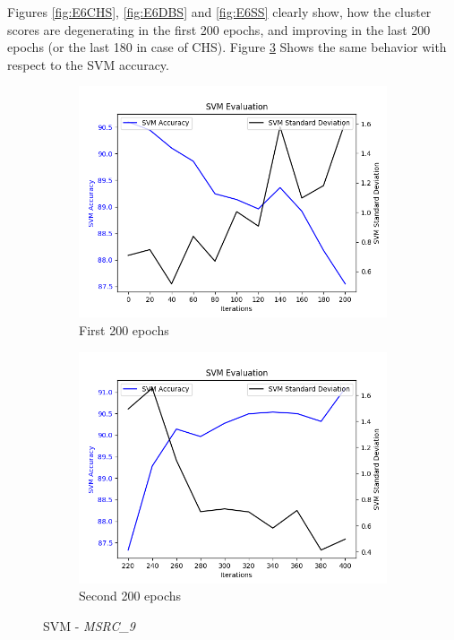 		Figures \ref{fig:E6CHS}, \ref{fig:E6DBS} and \ref{fig:E6SS} clearly show, how the cluster scores are degenerating in the first 200 epochs, and improving in the last 200  epochs (or the last 180 in case of CHS).
		Figure \ref{fig:E6SVM} Shows the same behavior with respect to the SVM accuracy.
				
		\begin{figure}[!ht]
			\centering
			\begin{subfigure}{0.49\textwidth}
				\centering
				\includegraphics[width=1.1\linewidth]{images/plotE6_SVM_MSRC_9_E_GDL_22_00h-05mExp3pull}
				\caption{First 200 epochs}
				\label{fig:plote6svmmsrc9egdl2200h-05mexp3pull}
			\end{subfigure}
			\begin{subfigure}{0.49\textwidth}
				\centering
				\includegraphics[width=1.1\linewidth]{images/plotE6_SVM_MSRC_9_E_GDL_22_00h-05mExp3pullpush}
				\caption{Second 200 epochs}
				\label{fig:plote6svmmsrc9egdl2200h-05mexp3pullpush}
			\end{subfigure}
			\caption{SVM - \textit{MSRC\_9}}
			\label{fig:E6SVM}
		\end{figure}
		

